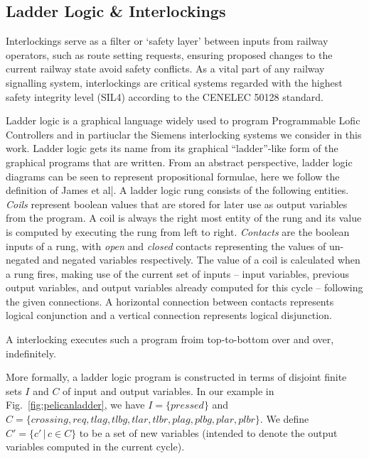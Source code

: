 \documentclass[conference,compsoc]{IEEEtran}
\begin{document}
\subsection{Ladder Logic \& Interlockings}
Interlockings serve as a filter or ‘safety layer’ between inputs from railway operators, such as route setting requests, ensuring proposed changes to the current railway state avoid safety conflicts. As a vital part of any railway signalling system, interlockings are critical systems regarded with the highest safety integrity level
(SIL4) according to the CENELEC 50128 standard. 

Ladder logic is a graphical language widely used to program Programmable Lofic Controllers\cite{IECstandard} and in partiuclar the Siemens interlocking systems we consider in this work. Ladder logic gets its name from its graphical ``ladder''-like form of the graphical programs that are written.  From an abstract perspective, ladder logic diagrams can be seen to represent
propositional formulae, here we follow the definition of James et al|\cite{sefm14}. A ladder logic rung consists of the following entities.
\emph{Coils}
represent boolean values that are stored for later use as output
variables from the program. A coil is always the right most entity
of the rung and its value is computed by executing the rung from left
to right.
\emph{Contacts} are the boolean inputs of a rung,
with \emph{open} and \emph{closed} contacts representing the values
of un-negated and negated variables respectively.  The value of a coil
is calculated when a rung fires, making use of the current set of
inputs -- input variables, previous output variables,
and output variables already computed for this cycle --
following the given connections.  A horizontal connection between
contacts represents logical conjunction and a vertical connection
represents logical disjunction.

A interlocking executes such a program froim top-to-bottom over and over, indefinitely.

More formally, a ladder logic program is constructed in terms of disjoint finite sets
$I$ and $C$ of input and output variables. In our example in
Fig.~\ref{fig:pelicanladder}, we have $I=\{pressed\}$ and $C =
\{crossing, req, tlag, tlbg, tlar, tlbr, plag, plbg, plar, plbr\}$.
We define $C' = \{ c' \, | \, c \in C \}$ to be a set of new variables
(intended to denote the output variables computed in the current
cycle).
\end{document}

